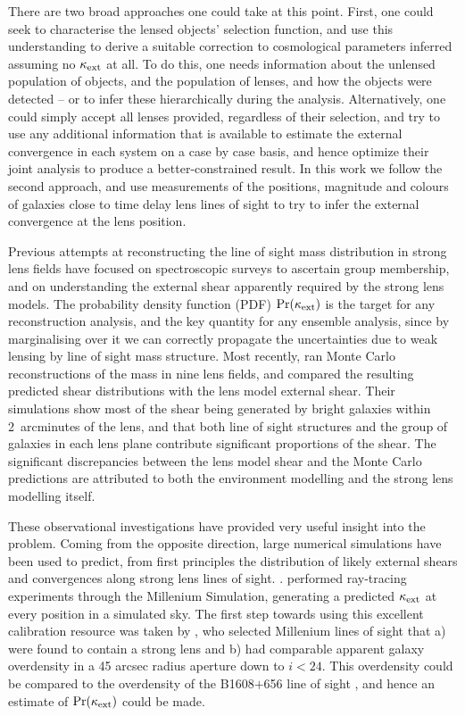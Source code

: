 \documentclass[useAMS,usenatbib]{mn2e}
\begin{document}
There are two broad approaches one could take at this point. First, one could
seek to characterise the lensed objects' selection function, and use this
understanding to derive a suitable correction to cosmological parameters
inferred assuming no $\kappa_{\rm ext}$ at all. To do this, one needs information about
the unlensed population of objects, and the population of lenses, and how the
objects were detected -- or to infer these hierarchically during the analysis.
Alternatively, one could simply accept all lenses provided, regardless of their
selection, and try to use any additional information that is available to
estimate the external convergence in each system on a case by case basis, and
hence optimize their joint analysis to produce a better-constrained result. In
this work we follow the second approach, and use measurements of the positions,
magnitude and colours of galaxies close to time delay lens lines of sight to try
to infer the external convergence at the lens position. 

Previous attempts at reconstructing the line of sight mass distribution in
strong lens fields have focused on spectroscopic surveys to ascertain group
membership, and on understanding the external shear apparently required by the
strong lens models.  The probability density function (PDF) $\Pr(\kappa_{\rm ext})$ is
the target for any reconstruction analysis, and the key quantity for any
ensemble analysis, since by marginalising over it we can correctly propagate
the uncertainties due to weak lensing by line of sight mass structure. 
 Most recently, \citet{Wong++2011} ran Monte
Carlo reconstructions of the mass in nine lens fields, and compared the
resulting predicted shear distributions with the lens model external shear.
Their simulations show most of  the shear being generated by bright galaxies
within 2~arcminutes of the lens, and that both line of sight structures and
the group of galaxies in each lens plane contribute significant proportions of
the shear. The significant discrepancies between the lens model shear and the
Monte Carlo predictions are attributed to both the environment modelling and
the strong lens modelling itself.

These observational investigations have provided very useful insight into the
problem.  Coming from the opposite direction, large numerical simulations have
been used to predict, from first principles the distribution of likely
external shears and convergences along strong lens lines of sight. . \citet{Hilbert++2009}
performed ray-tracing experiments through the Millenium Simulation, generating
a predicted $\kappa_{\rm ext}$ at every position in a simulated sky. The first step
towards using this excellent calibration resource was taken by
\citet{Suyu++2010}, who selected Millenium lines of sight that a) were found
to contain a strong lens and b) had comparable apparent galaxy overdensity in
a 45 arcsec radius aperture down to $i < 24$. This overdensity could be
compared to the overdensity of the B1608$+$656 line of sight
\citep{Fass+Koop2010}, and hence an estimate of  $\Pr(\kappa_{\rm ext})$ could be
made. 
\end{document}
